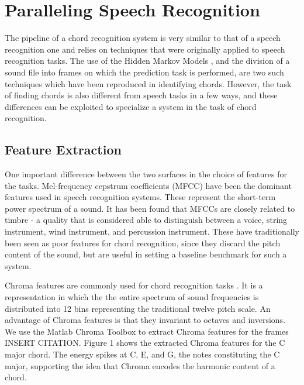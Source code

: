 \documentclass{article}
\begin{document}
\section{Paralleling Speech Recognition}

The pipeline of a chord recognition system is very similar to that of a speech
recognition one and relies on techniques that were originally applied to speech
recognition tasks. The use of the Hidden Markov Models \cite{young} , and the
division of a sound file into frames on which the prediction task is performed,
are two such techniques which have been reproduced in identifying chords.
However, the task of finding chords is also different from speech tasks in a few
ways, and these differences can be exploited to specialize a system in the task
of chord recognition.

\subsection{Feature Extraction}

One important difference between the two surfaces in the choice of features for
the tasks. Mel-frequency cepstrum coefficients (MFCC) have been the dominant
features used in speech recognition systems. These represent the short-term
power spectrum of a sound. It has been found that MFCCs are closely related to
timbre - a quality that is considered able to distinguish between a voice,
string instrument, wind instrument, and percussion instrument. These have
traditionally been seen as poor features for chord recognition, since they
discard the pitch content of the sound, but are useful in setting a baseline
benchmark for such a system.

Chroma features are commonly used for chord recognition tasks \cite{fujishima}.
It is a representation in which the the entire spectrum of sound frequencies is
distributed into 12 bins representing the traditional twelve pitch scale. An
advantage of Chroma features is that they invariant to octaves and inversions.
We use the Matlab Chroma Toolbox to extract Chroma features for the frames
INSERT CITATION. Figure 1 shows the extracted Chroma features for the C major
chord. The energy spikes at C, E, and G, the notes constituting the C major,
supporting the idea that Chroma encodes the harmonic content of a chord.
\end{document}
